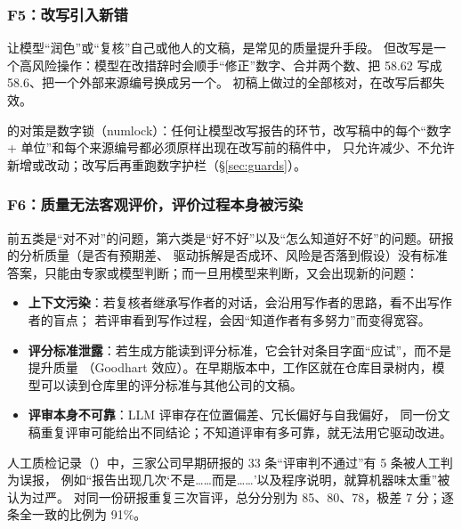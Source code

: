 \subsubsection{F5：改写引入新错}
让模型“润色”或“复核”自己或他人的文稿，是常见的质量提升手段\cite{madaan2023selfrefine}。
但改写是一个高风险操作：模型在改措辞时会顺手“修正”数字、合并两个数、把 58.62 写成 58.6、把一个外部来源编号换成另一个。
初稿上做过的全部核对，在改写后都失效。

\begin{failcase}[：润色时改了数字]
\end{failcase}

\sysname{} 的对策是数字锁（numlock）：任何让模型改写报告的环节，改写稿中的每个“数字 + 单位”和每个来源编号都必须原样出现在改写前的稿件中，
只允许减少、不允许新增或改动；改写后再重跑数字护栏（\S\ref{sec:guards}）。

\subsubsection{F6：质量无法客观评价，评价过程本身被污染}
前五类是“对不对”的问题，第六类是“好不好”以及“怎么知道好不好”的问题。研报的分析质量（是否有预期差、
驱动拆解是否成环、风险是否落到假设）没有标准答案，只能由专家或模型判断；而一旦用模型来判断，又会出现新的问题：
\begin{itemize}
  \item \textbf{上下文污染}：若复核者继承写作者的对话，会沿用写作者的思路，看不出写作者的盲点；
        若评审看到写作过程，会因“知道作者有多努力”而变得宽容。
  \item \textbf{评分标准泄露}：若生成方能读到评分标准，它会针对条目字面“应试”，而不是提升质量
        （Goodhart 效应）。在早期版本中，工作区就在仓库目录树内，模型可以读到仓库里的评分标准与其他公司的文稿。
  \item \textbf{评审本身不可靠}：LLM 评审存在位置偏差、冗长偏好与自我偏好\cite{zheng2023judging,panickssery2024self}，
        同一份文稿重复评审可能给出不同结论；不知道评审有多可靠，就无法用它驱动改进。
\end{itemize}

\begin{failcase}[：评审过严与评审不稳定]
人工质检记录（）中，三家公司早期研报的 33 条“评审判不通过”有 5 条被人工判为误报，
例如“报告出现几次‘不是……而是……’以及程序说明，就算机器味太重”被认为过严。
对同一份研报重复三次盲评，总分分别为 85、80、78，极差 7 分；逐条全一致的比例为 91\%。
\end{failcase}

